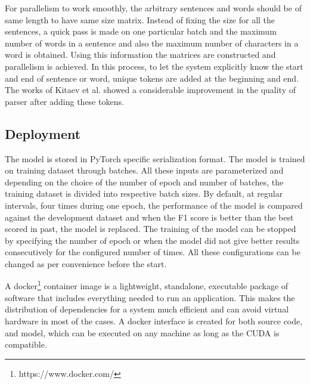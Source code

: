 \documentclass[a4paper, 11pt]{article}
\begin{document}
For parallelism to work smoothly, the arbitrary sentences and words should be of same length to have same size matrix. Instead of fixing the size for all the sentences, a quick pass is made on one particular batch and the maximum number of words in a sentence and also the maximum number of characters in a word is obtained. Using this information the matrices are constructed and parallelism is achieved. In this process, to let the system explicitly know the start and end of sentence or word, unique tokens are added at the beginning and end. The works of  Kitaev et al. \parencite*{Kitaev2019} showed a considerable improvement in the quality of parser after adding these tokens.

\subsection{Deployment}

The model is stored in PyTorch specific serialization format. The model is trained on training dataset through batches. All these inputs are parameterized and depending on the choice of the number of epoch and number of batches, the training dataset is divided into respective batch sizes. By default, at regular intervals, four times during one epoch, the performance of the model is compared against the development dataset and when the F1 score is better than the best scored in past, the model is replaced. The training of the model can be stopped by specifying the number of epoch or when the model did not give better results consecutively for the configured number of times. All these configurations can be changed as per convenience before the start. 

A docker\footnote{https://www.docker.com/} container image is a lightweight, standalone, executable package of software that includes everything needed to run an application. This makes the distribution of dependencies for a system much efficient and can avoid virtual hardware in most of the cases. A docker interface is created for both source code, and model, which can be executed on any machine as long as the CUDA is compatible. 



\end{document}
